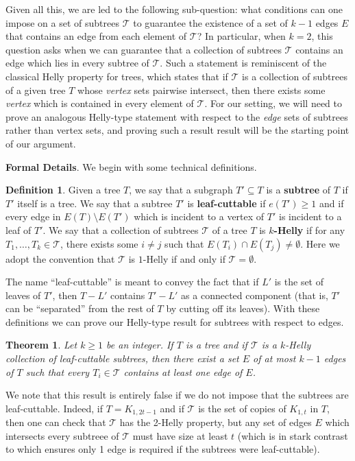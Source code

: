 \documentclass[12pt,letterpaper]{article}
\newtheorem{theorem}{Theorem}[section]
\theoremstyle{definition}
\newtheorem{definition}{Definition}
\renewcommand{\c}[1]{\mathcal{#1}}
\newcommand{\sub}{\subseteq}
\begin{document}
	Given all this, we are led to the following sub-question: what conditions can one impose on a set of subtrees $\c{T}$ to guarantee the existence of a set of $k-1$ edges $E$ that contains an edge from each element of $\c{T}$?  In particular, when $k=2$, this question asks when we can guarantee that a collection of subtrees $\c{T}$ contains an edge which lies in every subtree of $\c{T}$.  Such a statement is reminiscent of the classical Helly property for trees, which states that if $\c{T}$ is a collection of subtrees of a given tree $T$ whose \textit{vertex} sets pairwise intersect, then there exists some \textit{vertex} which is contained in every element of $\c{T}$.   For our setting, we will need to prove an analogous Helly-type statement with respect to the \textit{edge} sets of subtrees rather than vertex sets, and proving such a result result will be the starting point of our argument.
	
	\textbf{Formal Details}.  We begin with some technical definitions.
	
	\begin{definition}
		Given a tree $T$, we say that a subgraph $T'\sub T$ is a \textbf{subtree} of $T$ if $T'$ itself is a tree.  We say that a subtree $T'$ is \textbf{leaf-cuttable} if $e(T')\ge 1$ and if every edge in $E(T)\setminus E(T')$ which is incident to a vertex of $T'$ is incident to a leaf of $T'$.  We say that a collection of subtrees $\c{T}$ of a tree $T$ is \textbf{$k$-Helly} if for any $T_1,\ldots,T_k\in \c{T}$, there exists some $i\ne j$ such that $E(T_i)\cap E(T_j)\ne \emptyset$.  Here we adopt the convention that $\c{T}$ is $1$-Helly if and only if $\c{T}=\emptyset$.
	\end{definition}
	
	The name ``leaf-cuttable'' is meant to convey the fact that if $L'$ is the set of leaves of $T'$, then $T-L'$ contains $T'-L'$ as a connected component (that is, $T'$ can be ``separated'' from the rest of $T$ by cutting off its leaves).  With these definitions we can prove our Helly-type result for subtrees with respect to edges.
	\begin{theorem}\label{thm:Helly}
		Let $k\geq 1$ be an integer. If $T$ is a tree and if $\c{T}$ is a $k$-Helly collection of leaf-cuttable subtrees, then there exist a set $E$ of at most $k-1$ edges of $T$ such that every $T_i\in \c{T}$ contains at least one edge of $E$.
	\end{theorem}
	We note that this result is entirely false if we do not impose that the subtrees are leaf-cuttable.  Indeed, if $T=K_{1,2t-1}$ and if $\c{T}$ is the set of copies of $K_{1,t}$ in $T$, then one can check that $\c{T}$ has the 2-Helly property, but any set of edges $E$ which intersects every subtreee of $\c{T}$ must have size at least $t$ (which is in stark contrast to  which ensures only 1 edge is required if the subtrees were leaf-cuttable).
	
\end{document}
